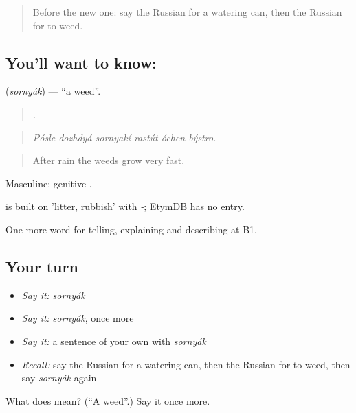 \begin{quote}
Before the new one: say the Russian for a watering can, then the Russian for to weed.
\end{quote}

\subsection*{You'll want to know: }
\textbf{} (\emph{sornyák}) — \textquotedblleft{}a weed\textquotedblright{}.

\begin{quote}
     .
\end{quote}

\begin{quote}
\emph{Pósle dozhdyá sornyakí rastút óchen býstro.}
\end{quote}

\begin{quote}
After rain the weeds grow very fast.
\end{quote}

Masculine; genitive .

\begin{cousinweb}
\emph{} is built on \emph{} 'litter, rubbish' with \emph{-}; EtymDB has no entry.
\end{cousinweb}

\begin{grammarlens}[title={What you've built}]
One more word for telling, explaining and describing at B1.
\end{grammarlens}

\subsection*{Your turn}
\begin{itemize}
\raggedright
  \item \emph{Say it:} \emph{sornyák}
  \item \emph{Say it:} \emph{sornyák}, once more
  \item \emph{Say it:} a sentence of your own with \emph{sornyák}
  \item \emph{Recall:} say the Russian for a watering can, then the Russian for to weed, then say \emph{sornyák} again
\end{itemize}

\begin{tcolorbox}[breakable,colback=teal!4,colframe=teal!35!black,title={Before you move on}]
What does  mean? (\textquotedblleft{}A weed\textquotedblright{}.) Say it once more.
\end{tcolorbox}
